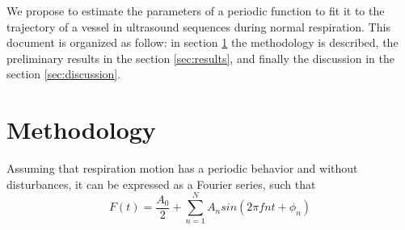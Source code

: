 \documentclass[10pt,a4paper,report]{article}
\begin{document}

We propose to estimate the parameters of a periodic function to fit it to the trajectory of a vessel in ultrasound  sequences during normal respiration. This document is organized as follow: in section \ref{sec:methodology} the methodology is described, the preliminary results in the section \ref{sec:results}, and finally the discussion in the section \ref{sec:discussion}.


\section{Methodology}
\label{sec:methodology}


Assuming that respiration motion has a periodic behavior and without disturbances, it can be expressed as a Fourier series, such that
\begin{equation}
F(t) = \frac{A_0}{2} + \sum_{n=1}^{N} A_n sin( 2 \pi f n  t + \phi_n )
\end{equation}
\end{document}
